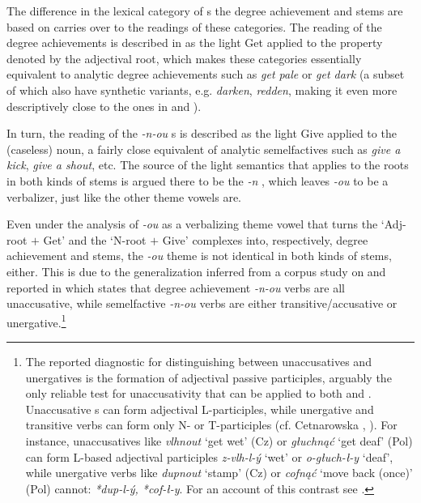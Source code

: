 The  difference  in the lexical category of s the  degree achievement and   stems are based on carries over to the readings of these categories. The reading of the degree achievements is described in \cite{NU} as the light  Get applied to the property denoted by the adjectival root, which makes these categories essentially equivalent to  analytic degree achievements such as \textit{get pale} or \textit{get dark} (a subset of which also have synthetic variants, e.g. \textit{darken}, \textit{redden}, making it even more descriptively close to the ones in  and ). 
\par
In turn, the reading of the \textit{-n-ou} s is described as the light  Give applied to the (caseless) noun, a fairly close equivalent of  analytic semelfactives such as \textit{give a kick}, \textit{give a shout}, etc. The source of the light  semantics that applies to the roots in both kinds of stems is argued there to be the \textit{-n} , which leaves \textit{-ou} to be a verbalizer, just like the other theme vowels are.
\par Even under the analysis of \textit{-ou} as a verbalizing theme vowel that turns the `Adj-root $+$ Get'  and the `N-root $+$ Give' complexes into, respectively,  degree achievement and   stems, the \textit{-ou} theme is not identical in both kinds of stems, either. This is due to the generalization inferred from a corpus study on  and  reported in \cite{NU} which states that degree achievement \textit{-n-ou} verbs are all unaccusative, while semelfactive \textit{-n-ou} verbs are either transitive/accusative or unergative.\footnote{\label{fn:L}The reported diagnostic for distinguishing between unaccusatives and unergatives is the formation of adjectival passive participles, arguably the only reliable test for unaccusativity that can be applied to both  and . Unaccusative s can form adjectival L-participles, while unergative and transitive verbs can form only N- or T-participles (cf. Cetnarowska \citeyear{Cetnarowska2002b}, \citeyear{Cetnarowska2002a}).  For instance, unaccusatives like \textit{vlhnout} `get wet' (Cz) or \textit{g\l uchn\k{a}\'c} `get deaf' (Pol) can form L-based adjectival participles \textit{z-vlh-l-\'y} `wet' or \textit{o-g\l uch-\l-y} `deaf', while unergative verbs like \textit{dupnout} `stamp' (Cz) or \textit{cofn\k{a}\'c} `move back (once)' (Pol) cannot: \textit{*dup-l-\'y, *cof-\l-y}. For an account of this contrast see \cite{LTN}.
} %
